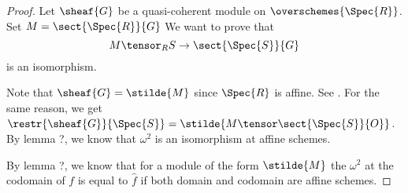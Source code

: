 \begin{proof}
Let $\sheaf{G}$ be a quasi-coherent module on $\overschemes{\Spec{R}}$.
Set $M = \sect{\Spec{R}}{G}$
We want to prove that 
\[
M \tensor_{R} S \rightarrow \sect{\Spec{S}}{G}
\]
is an isomorphism.

Note that $\sheaf{G} = \stilde{M}$ since $\Spec{R}$ is affine. See .
For the same reason, we get $\restr{\sheaf{G}}{\Spec{S}} = \stilde{M \tensor \sect{\Spec{S}}{O}}$.
By lemma ?, we know that $\omega^2$ is an isomorphism at affine schemes.

By lemma ?, we know that for a module of the form $\stilde{M}$ 
the $\omega^2$ at the codomain of $f$ is equal to $\hat{f}$
if both domain and codomain are affine schemes.
\end{proof}

